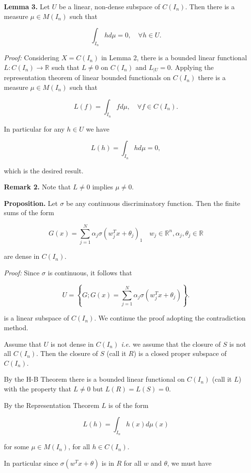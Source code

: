 \textbf{Lemma 3.} Let $U$ be a linear, non-dense subspace of $C\left(I_n\right)$. Then there is a measure $\mu \in M\left(I_n\right)$ such that

$$
\int_{I_n} h d\mu=0, \quad \forall h \in U .
$$

\textit{Proof:} Considering $X=C\left(I_n\right)$ in Lemma 2, there is a bounded linear functional $L: C\left(I_n\right) \rightarrow \mathbb{R}$ such that $L \neq 0$ on $C\left(I_n\right)$ and $L_{\mid U}=0$. Applying the representation theorem of linear bounded functionals on $C\left(I_n\right)$ there is a measure $\mu \in M\left(I_n\right)$ such that

$$
L(f)=\int_{I_n} f d \mu, \quad \forall f \in C\left(I_n\right).
$$

In particular for any $h\in U$ we have

$$
L(h)=\int_{I_n} h d \mu=0,
$$

which is the desired result.

\textbf{Remark 2.} Note that $L\neq 0$ implies $\mu\neq 0$.

\textbf{Proposition.} Let $\sigma$ be any continuous discriminatory function. Then the finite sums of the form

$$
G(x)=\sum_{j=1}^N \alpha_j \sigma\left(w_j^T x+\theta_j\right)_1 \quad w_j \in \mathbb{R}^n, \alpha_j, \theta_j \in \mathbb{R}
$$

are dense in $C\left(I_n\right)$.

\textit{Proof:} Since $\sigma$ is continuous, it follows that

$$
U=\left\{G ; G(x)=\sum_{j=1}^N \alpha_j \sigma\left(w_j^T x+\theta_j\right)\right\} .
$$

is a linear subspace of $C\left(I_n\right)$. We continue the proof adopting the contradiction method.

Assume that $U$ is not dense in $C\left(I_n\right)$ \textit{i.e.} we assume that the closure of $S$ is not all $C(I_n)$. Then the closure of $S$ (call it $R$) is a closed proper subspace of $C(I_n)$.

By the H-B Theorem there is a bounded linear functional on $C(I_n)$ (call it $L$) with the property that $L\neq 0$ but $L(R)=L(S)=0$.

By the Representation Theorem $L$ is of the form

$$
L(h) = \int_{I_n}h(x)d\mu(x)
$$

for some $\mu\in M(I_n)$, for all $h\in C(I_n)$.

In particular since $\sigma(w^Tx+\theta)$ is in $R$ for all $w$ and $\theta$, we must have

